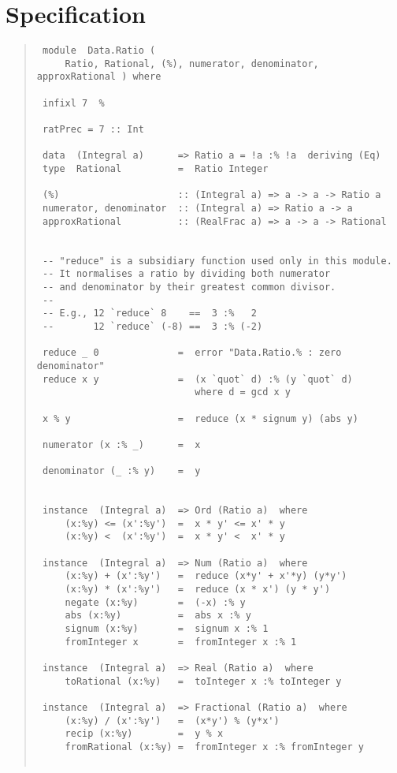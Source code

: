 \section{Specification
}
\begin{quote}
{\haddockverb\begin{verbatim}
 module  Data.Ratio (
     Ratio, Rational, (%), numerator, denominator, approxRational ) where
 
 infixl 7  %
 
 ratPrec = 7 :: Int
 
 data  (Integral a)      => Ratio a = !a :% !a  deriving (Eq)
 type  Rational          =  Ratio Integer
 
 (%)                     :: (Integral a) => a -> a -> Ratio a
 numerator, denominator  :: (Integral a) => Ratio a -> a
 approxRational          :: (RealFrac a) => a -> a -> Rational
 
 
 -- "reduce" is a subsidiary function used only in this module.
 -- It normalises a ratio by dividing both numerator
 -- and denominator by their greatest common divisor.
 --
 -- E.g., 12 `reduce` 8    ==  3 :%   2
 --       12 `reduce` (-8) ==  3 :% (-2)
 
 reduce _ 0              =  error "Data.Ratio.% : zero denominator"
 reduce x y              =  (x `quot` d) :% (y `quot` d)
                            where d = gcd x y
 
 x % y                   =  reduce (x * signum y) (abs y)
 
 numerator (x :% _)      =  x
 
 denominator (_ :% y)    =  y
 
 
 instance  (Integral a)  => Ord (Ratio a)  where
     (x:%y) <= (x':%y')  =  x * y' <= x' * y
     (x:%y) <  (x':%y')  =  x * y' <  x' * y
 
 instance  (Integral a)  => Num (Ratio a)  where
     (x:%y) + (x':%y')   =  reduce (x*y' + x'*y) (y*y')
     (x:%y) * (x':%y')   =  reduce (x * x') (y * y')
     negate (x:%y)       =  (-x) :% y
     abs (x:%y)          =  abs x :% y
     signum (x:%y)       =  signum x :% 1
     fromInteger x       =  fromInteger x :% 1
 
 instance  (Integral a)  => Real (Ratio a)  where
     toRational (x:%y)   =  toInteger x :% toInteger y
 
 instance  (Integral a)  => Fractional (Ratio a)  where
     (x:%y) / (x':%y')   =  (x*y') % (y*x')
     recip (x:%y)        =  y % x
     fromRational (x:%y) =  fromInteger x :% fromInteger y
 

\end{verbatim}}
\end{quote}
